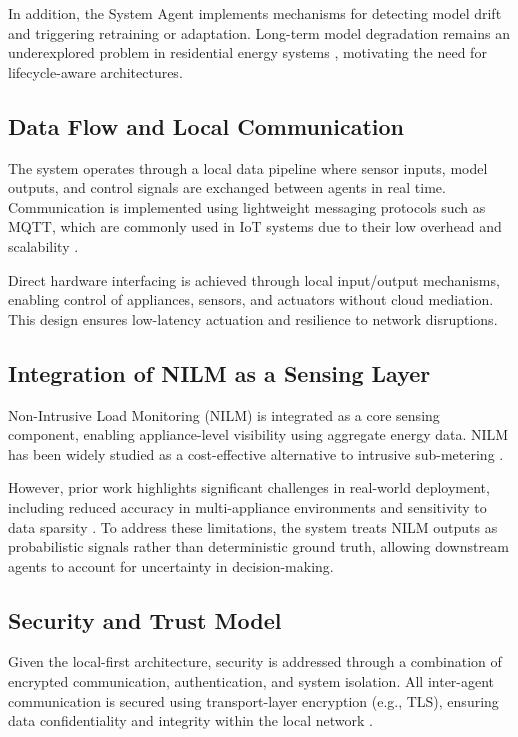 \documentclass[11pt,a4paper]{article}
\begin{document}
In addition, the System Agent implements mechanisms for detecting model drift and triggering retraining or adaptation. Long-term model degradation remains an underexplored problem in residential energy systems \cite{dincecco2020transfer}, motivating the need for lifecycle-aware architectures.

\subsection{Data Flow and Local Communication}

The system operates through a local data pipeline where sensor inputs, model outputs, and control signals are exchanged between agents in real time. Communication is implemented using lightweight messaging protocols such as MQTT, which are commonly used in IoT systems due to their low overhead and scalability \cite{naik2017choice}.

Direct hardware interfacing is achieved through local input/output mechanisms, enabling control of appliances, sensors, and actuators without cloud mediation. This design ensures low-latency actuation and resilience to network disruptions.

\subsection{Integration of NILM as a Sensing Layer}

Non-Intrusive Load Monitoring (NILM) is integrated as a core sensing component, enabling appliance-level visibility using aggregate energy data. NILM has been widely studied as a cost-effective alternative to intrusive sub-metering \cite{ruano2019nilm}.

However, prior work highlights significant challenges in real-world deployment, including reduced accuracy in multi-appliance environments and sensitivity to data sparsity \cite{tang2023nilm}. To address these limitations, the system treats NILM outputs as probabilistic signals rather than deterministic ground truth, allowing downstream agents to account for uncertainty in decision-making.

\subsection{Security and Trust Model}

Given the local-first architecture, security is addressed through a combination of encrypted communication, authentication, and system isolation. All inter-agent communication is secured using transport-layer encryption (e.g., TLS), ensuring data confidentiality and integrity within the local network \cite{kothmayr2013dtls}.
\end{document}

